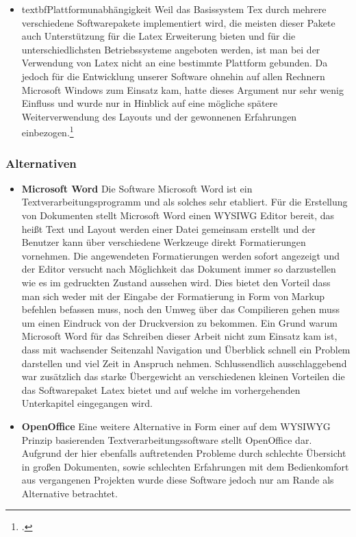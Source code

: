 \begin{itemize}
\item textbf{Plattformunabhängigkeit}
Weil das Basissystem Tex durch mehrere verschiedene Softwarepakete implementiert wird, die meisten dieser Pakete auch Unterstützung für die Latex Erweiterung bieten und für die unterschiedlichsten Betriebssysteme angeboten werden, ist man bei der Verwendung von Latex nicht an eine bestimmte Plattform gebunden. Da jedoch für die Entwicklung unserer Software ohnehin auf allen Rechnern Microsoft Windows zum Einsatz kam, hatte dieses Argument nur sehr wenig Einfluss und wurde nur in Hinblick auf eine mögliche spätere Weiterverwendung des Layouts und der gewonnenen Erfahrungen einbezogen.\footcite[vgl.][]{latexgraz}
\end{itemize}
\subsubsection{Alternativen}
\begin{itemize}
\item \textbf{Microsoft Word}
Die Software Microsoft Word ist ein Textverarbeitungsprogramm und als solches sehr etabliert. Für die Erstellung von Dokumenten stellt Microsoft Word einen WYSIWG Editor bereit, das heißt Text und Layout werden einer Datei gemeinsam erstellt und der Benutzer kann über verschiedene Werkzeuge direkt Formatierungen vornehmen. Die angewendeten Formatierungen werden sofort angezeigt und der Editor versucht nach Möglichkeit das Dokument immer so darzustellen wie es im gedruckten Zustand aussehen wird. Dies bietet den Vorteil dass man sich weder mit der Eingabe der Formatierung in Form von Markup befehlen befassen muss, noch den Umweg über das Compilieren gehen muss um einen Eindruck von der Druckversion zu bekommen.
Ein Grund warum Microsoft Word für das Schreiben dieser Arbeit nicht zum Einsatz kam ist, dass mit wachsender Seitenzahl Navigation und Überblick schnell ein Problem darstellen und viel Zeit in Anspruch nehmen. Schlussendlich ausschlaggebend war zusätzlich das starke Übergewicht an verschiedenen kleinen Vorteilen die das Softwarepaket Latex bietet und auf welche im vorhergehenden Unterkapitel eingegangen wird.
\item \textbf{OpenOffice}
Eine weitere Alternative in Form einer auf dem WYSIWYG Prinzip basierenden Textverarbeitungssoftware stellt OpenOffice dar. Aufgrund der hier ebenfalls auftretenden Probleme durch schlechte Übersicht in großen Dokumenten, sowie schlechten Erfahrungen mit dem Bedienkomfort aus vergangenen Projekten wurde diese Software jedoch nur am Rande als Alternative betrachtet.
\end{itemize}